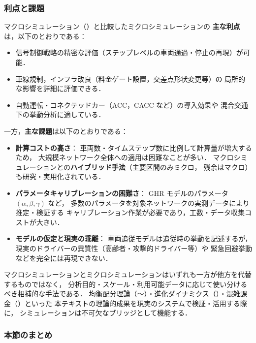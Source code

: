 \subsubsection*{利点と課題}

マクロシミュレーション（）と比較したミクロシミュレーションの
\textbf{主な利点}は，以下のとおりである：

\begin{itemize}
  \item 信号制御戦略の精密な評価（ステップレベルの車両通過・停止の再現）が可能．
  \item 車線規制，インフラ改良（料金ゲート設置，交差点形状変更等）の
        局所的な影響を詳細に評価できる．
  \item 自動運転・コネクテッドカー（ACC，CACC など）の導入効果や
        混合交通下の挙動分析に適している．
\end{itemize}

一方，\textbf{主な課題}は以下のとおりである：

\begin{itemize}
  \item \textbf{計算コストの高さ}：
    車両数・タイムステップ数に比例して計算量が増大するため，
    大規模ネットワーク全体への適用は困難なことが多い．
    マクロシミュレーションとの\textbf{ハイブリッド手法}（主要区間のみミクロ，
    残余はマクロ）も研究・実用化されている．
  \item \textbf{パラメータキャリブレーションの困難さ}：
    GHR モデルのパラメータ $(\alpha, \beta, \gamma)$ など，
    多数のパラメータを対象ネットワークの実測データにより推定・検証する
    キャリブレーション作業が必要であり，工数・データ収集コストが大きい．
  \item \textbf{モデルの仮定と現実の乖離}：
    車両追従モデルは追従時の挙動を記述するが，
    現実のドライバーの異質性（高齢者・攻撃的ドライバー等）や
    緊急回避挙動などを完全には再現できない．
\end{itemize}

マクロシミュレーションとミクロシミュレーションはいずれも一方が他方を代替するものではなく，
分析目的・スケール・利用可能データに応じて使い分けるべき相補的な手法である．
均衡配分理論（〜）・進化ダイナミクス（）・混雑課金（）といった
本テキストの理論的成果を現実のシステムで検証・活用する際に，
シミュレーションは不可欠なブリッジとして機能する．

\subsubsection*{本節のまとめ}

